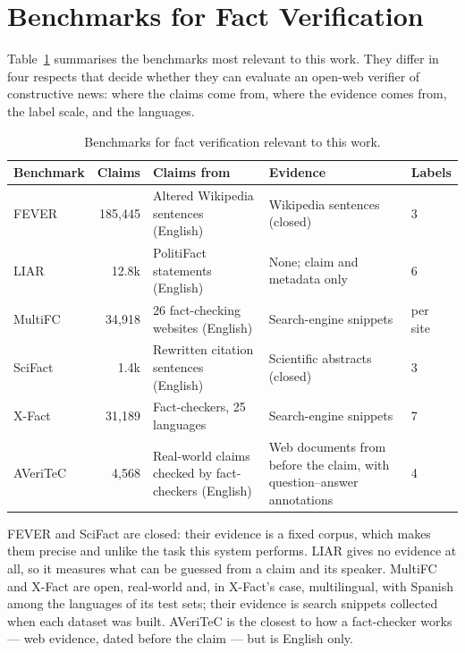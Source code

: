 
\section{Benchmarks for Fact Verification}
\label{sec:sota-benchmarks}

Table~\ref{tab:sota-benchmarks} summarises the benchmarks most relevant
to this work. They differ in four respects that decide whether they can
evaluate an open-web verifier of constructive news: where the claims
come from, where the evidence comes from, the label scale, and the
languages.

\begin{table}[ht]
\centering
\small
\begin{tabularx}{\linewidth}{@{}lrXXl@{}}
\toprule
\textbf{Benchmark} & \textbf{Claims} & \textbf{Claims from} &
\textbf{Evidence} & \textbf{Labels} \\
\midrule
FEVER \cite{thorne2018fever} & 185,445 & Altered Wikipedia sentences
(English) & Wikipedia sentences (closed) & 3 \\
LIAR \cite{wang2017liar} & 12.8k & PolitiFact statements (English) &
None; claim and metadata only & 6 \\
MultiFC \cite{augenstein2019multifc} & 34,918 & 26 fact-checking
websites (English) & Search-engine snippets & per site \\
SciFact \cite{wadden2020scifact} & 1.4k & Rewritten citation sentences
(English) & Scientific abstracts (closed) & 3 \\
X-Fact \cite{gupta2021xfact} & 31,189 & Fact-checkers, 25 languages &
Search-engine snippets & 7 \\
AVeriTeC \cite{schlichtkrull2023averitec} & 4,568 & Real-world claims
checked by fact-checkers (English) & Web documents from before the
claim, with question--answer annotations & 4 \\
\bottomrule
\end{tabularx}
\caption{Benchmarks for fact verification relevant to this work.}
\label{tab:sota-benchmarks}
\end{table}

FEVER and SciFact are closed: their evidence is a fixed corpus, which
makes them precise and unlike the task this system performs. LIAR
gives no evidence at all, so it measures what can be guessed from a
claim and its speaker. MultiFC and X-Fact are open, real-world and, in
X-Fact's case, multilingual, with Spanish among the languages of its
test sets; their evidence is search snippets collected when each
dataset was built. AVeriTeC is the closest to how a fact-checker works
--- web evidence, dated before the claim --- but is English only.

